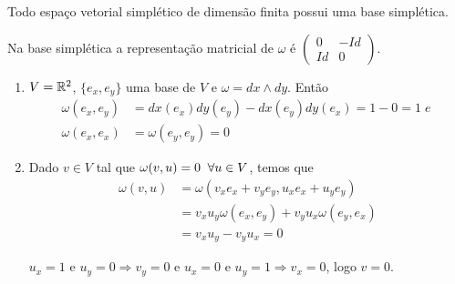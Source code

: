 \documentclass{beamer}
\begin{document}
	\begin{frame}
		
		\begin{teorema}
			Todo espaço vetorial simplético de dimensão finita possui uma base simplética.
		\end{teorema}
		
		\begin{observacao}
			Na base simplética a representação matricial de $\omega$ é $\left(
			\begin{array}{cc}
			0 & -Id
			\\
			Id & 0
			\end{array}
			\right) $.
		\end{observacao}
	\end{frame}
	
	\begin{frame}
	\begin{exemplo}
			\begin{enumerate}
				\item $V = \mathbb{R}^{2}$, $\{e_{x}, e_{y}\}$ uma base de $V$ e $\omega=dx \wedge dy$. Então 
				$$
				\begin{aligned}
					\omega(e_{x}, e_{y}) &=dx(e_{x}) dy(e_{y}) - dx(e_{y}) dy(e_{x}) = 1-0= 1 \; e\; 
					\\
					\omega(e_{x}, e_{x}) &= \omega(e_{y}, e_{y}) = 0	
				\end{aligned}
				$$ 
				
				\item Dado $v \in V$ tal que $\omega(v, u)=0 \;\;\forall u \in V$, temos que 
				$$
				\begin{aligned}
					\omega(v, u) &= \omega(v_{x}e_{x}+v_{y}e_{y}, u_{x}e_{x}+u_{y}e_{y})
					\\
					&=
					v_{x}u_{y}\omega(e_{x}, e_{y}) +v_{y}u_{x}\omega(e_{y}, e_{x})
					\\
					&= v_{x}u_{y} -v_{y}u_{x} = 0
				\end{aligned}
				$$
				
				$u_{x} = 1$ e $u_{y} = 0 \Rightarrow v_{y} = 0$ e $u_{x} = 0$ e $u_{y} = 1 \Rightarrow v_{x} = 0$, logo $v=0$.
				
			\end{enumerate}			
		\end{exemplo}
	\end{frame}
	
\end{document}
